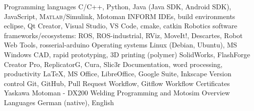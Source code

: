 
\begin{cvskills}
  \cvskill
    {Programming languages}
    {C/C++, Python, Java (Java SDK, Android SDK), JavaScript, \textsc{Matlab}/Simulink, \newline Motoman INFORM}
  \cvskill
    {IDEs, build environments}
    {eclipse, Qt Creator, Visual Studio, VS Code, cmake, catkin}
  \cvskill
    {Robotics software frameworks/ecosystems:}
    {ROS, ROS-industrial, RViz, MoveIt!, Descartes, Robot Web Tools, \newline rosserial-arduino}
  \cvskill
    {Operating systems}
    {Linux (Debian, Ubuntu), MS Windows}
  \cvskill
    {CAD, rapid prototyping, 3D printing (polymer)}
    {SolidWorks, FlashForge Creator Pro, ReplicatorG, Cura, Slic3r}
  \cvskill
    {Documentation, word processing, productivity}
    {\LaTeX, MS Office, LibreOffice, Google Suite, Inkscape}
  \cvskill
    {Version control}
    {Git, GitHub, Pull Request Workflow, Gitflow Workflow}
  \cvskill
    {Certificates}
    {Yaskawa Motoman - DX200 Welding Programming and Motosim Overview}
  \cvskill
    {Languages}
    {German (native), English}

\end{cvskills}
